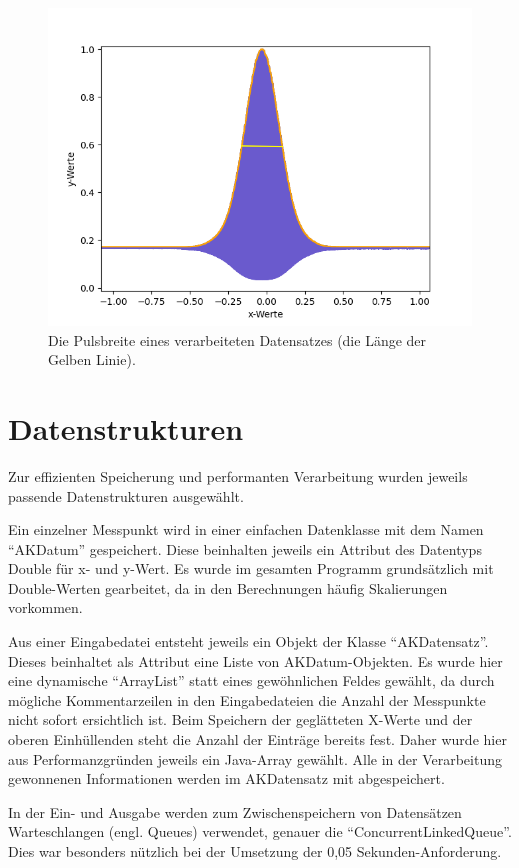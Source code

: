 \begin{figure}[htb]
    \centering
    \includegraphics[width=0.7\linewidth]{images/Pulsbreite}
    \caption{
        Die Pulsbreite eines verarbeiteten Datensatzes (die Länge der Gelben Linie).
    }
    \label{fig:pulsbreite}
\end{figure}

\section{Datenstrukturen}\label{sec:datenstrukt}
Zur effizienten Speicherung und performanten Verarbeitung wurden jeweils passende Datenstrukturen ausgewählt.

Ein einzelner Messpunkt wird in einer einfachen Datenklasse mit dem Namen \enquote{AKDatum} gespeichert.
Diese beinhalten jeweils ein Attribut des Datentyps Double für x- und y-Wert.
Es wurde im gesamten Programm grundsätzlich mit Double-Werten gearbeitet, da in den Berechnungen häufig Skalierungen vorkommen.

Aus einer Eingabedatei entsteht jeweils ein Objekt der Klasse \enquote{AKDatensatz}.
Dieses beinhaltet als Attribut eine Liste von AKDatum-Objekten.
Es wurde hier eine dynamische \enquote{ArrayList} statt eines gewöhnlichen Feldes gewählt, da durch mögliche Kommentarzeilen in den Eingabedateien die Anzahl der Messpunkte nicht sofort ersichtlich ist.
Beim Speichern der geglätteten X-Werte und der oberen Einhüllenden steht die Anzahl der Einträge bereits fest.
Daher wurde hier aus Performanzgründen jeweils ein Java-Array gewählt.
Alle in der Verarbeitung gewonnenen Informationen werden im AKDatensatz mit abgespeichert.

In der Ein- und Ausgabe werden zum Zwischenspeichern von Datensätzen Warteschlangen (engl. Queues) verwendet, genauer die \enquote{ConcurrentLinkedQueue}.
Dies war besonders nützlich bei der Umsetzung der 0,05 Sekunden-Anforderung.





